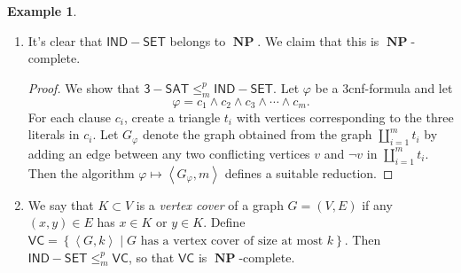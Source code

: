 \documentclass[10pt,letterpaper,cm]{nupset}
\theoremstyle{definition}
\newtheorem{exmp}[definition]{Example}
\theoremstyle{theorem}
\theoremstyle{remark}
\newcommand{\1}{\mathbf{1}}
\newcommand{\0}{\vec 0}
\DeclareMathOperator{\NP}{\mathbf{NP}}
\begin{document}
\begin{exmp}
\begin{enumerate}
\begin{proof}
Let $g_1, \ldots, g_n$ and $x_1, \ldots, x_m$ denote  the Boolean values given by the edges and inputs of $C$, respectively. Relabel $g_1, \ldots, g_n, x_1, \ldots, x_m$ as $w_1, \ldots, w_{n+m}$. Let $\varphi$ be the 3cnf formula in the variables $w_1, \ldots, w_{n+m}$ where each clause of $\varphi$ corresponds either to $C$'s output value $w_s \vee w_s \vee w_s$ or to one of $C$'s internal edges. In the latter case, we can give the following descriptions.
\begin{itemize}
\item  If $w_j = \neg w_i$, then $\varphi$ contains exactly one clause of the form $$  \left(w_i \vee w_j\right) \land \left(\neg w_i \vee \neg w_j\right).
$$
\item If $w_h = w_i \land w_j$ in $C$, then $\varphi$ contains exactly one clause of the form $$  \left(w_i \vee w_j \vee \neg w_h\right) \land \left(w_i \vee \neg w_j \vee \neg w_h\right) \land \left(\neg w_i \vee w_j \vee \neg w_h\right) \land \left(\neg w_i \vee \neg w_j \vee w_h\right).$$
\item If $w_h = w_i \vee w_j$ in $C$, then $\varphi$ contains exactly one clause of the form $$ \left(w_i \vee w_j \vee \neg w_h\right) \land \left(w_i \vee \neg w_j \vee w_h\right) \land \left(\neg w_i \vee w_j \vee w_h\right) \land \left(\neg w_i \vee \neg w_j \vee w_h\right)
.$$
\end{itemize} By construction, $\varphi$ is satisfiable if and only if $C$ is. The algorithm $M: \left\langle C \right\rangle \mapsto \varphi$ is linear in $n^k$, hence efficient. Therefore, it is a suitable reduction. 
\end{proof}
\item  It's clear that $\mathsf{IND{-}SET}$ belongs to $\NP$. We claim that this is $\NP$-complete.
\begin{proof}
We show that $\mathsf{3{-}SAT} \leq_m^p \mathsf{IND{-}SET}$.  Let $\varphi$ be a 3cnf-formula and let $$\varphi = c_1 \land c_2 \land c_3 \land \cdots \land c_m.$$ For each clause $c_i$, create a triangle $t_i$ with vertices corresponding to the three literals in $c_i$. Let $G_{\varphi}$ denote the graph obtained from the graph $\coprod_{i=1}^m t_i$ by adding an edge between any two conflicting vertices $v$ and $\neg v$ in $\coprod_{i=1}^m t_i$. Then the algorithm $\varphi \mapsto \left\langle G_{\varphi}, m\right\rangle$ defines a suitable reduction. 
\end{proof}
\item We say that $K \subset V$ is a \textit{vertex cover} of a graph $G=\left(V, E\right)$ if any $\left(x,y\right) \in E$ has $x\in K$ or $y\in K$. Define $\mathsf{VC}= \left\{ \left\langle G, k\right\rangle \mid G\text{ has a vertex cover of size at most }k\right\}$. Then $\mathsf{IND{-}SET} \leq_m^p \mathsf{VC}$, so that $\mathsf{VC}$ is $\NP$-complete.  

\end{enumerate}
\end{exmp}
\end{document}
